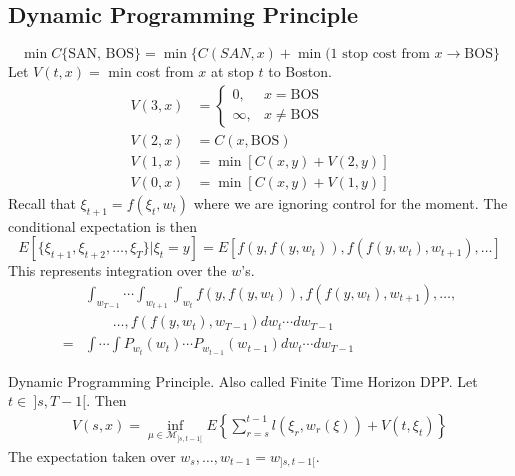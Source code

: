 \subsection{Dynamic Programming Principle}
$$\min C\{\text{SAN,~BOS}\} = \min\{C(SAN,x) + \min(\text{1~stop~cost~from }x\to\text{BOS}\}$$
Let $V(t,x) =$ min cost from $x$ at stop $t$ to Boston.
\begin{align*}
V(3,x) &= \begin{cases} 0, & x=\text{BOS} \\ \infty, & x\neq\text{BOS} \end{cases} \\
V(2,x) &= C(x,\text{BOS}) \\
V(1,x) &= \min[C(x,y)+V(2,y)] \\
V(0,x) &= \min[C(x,y)+V(1,y)]
\end{align*}
Recall that $\xi_{t+1}=f(\xi_t,w_t)$ where we are ignoring control for the moment.
The conditional expectation is then
$$E[\{\xi_{t+1},\xi_{t+2},\ldots,\xi_T\}|\xi_t=y] = E[f(y,f(y,w_t)),f(f(y,w_t),w_{t+1}),\ldots]$$
This represents integration over the $w$'s.
\begin{align*}
&\int_{w_{T-1}}\cdots\int_{w_{t+1}}\int_{w_t}f(y,f(y,w_t)),f(f(y,w_t),w_{t+1}),\ldots, \\
&\qquad \ldots,f(f(y,w_t),w_{T-1})dw_t\cdots dw_{T-1} \\
= &\int\cdots\int P_{w_t}(w_t)\cdots P_{w_{t-1}}(w_{t-1})dw_t\cdots dw_{T-1}
\end{align*}

\begin{theorem}{Dynamic Programming Principle.}
Also called Finite Time Horizon DPP\@.
Let $t\in~]s,T-1[$.%
Then
\begin{align}
\label{eq:dpp}
V(s,x) = \inf_{\mu\in\mathcal{M}_{]s,t-1[}}E\left\lbrace\sum_{r=s}^{t-1}l(\xi_r,w_r(\xi)) + V(t,\xi_t)\right\rbrace%
\end{align}
The expectation taken over $w_s,\ldots,w_{t-1} = w_{]s,t-1[}$.%
\end{theorem}


